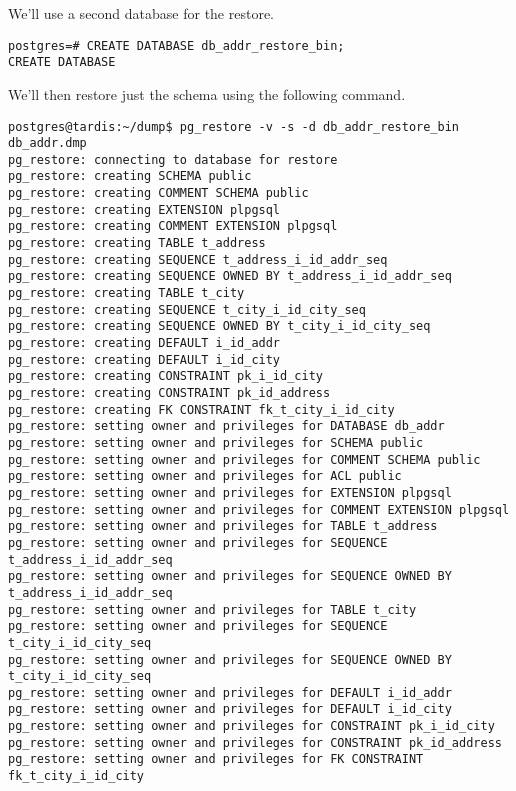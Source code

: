 We'll use a second database for the restore.

\begin{lstlisting}[style=pgsql]
postgres=# CREATE DATABASE db_addr_restore_bin;
CREATE DATABASE

\end{lstlisting}

We'll then restore just the schema using the following command.

\begin{verbatim}
postgres@tardis:~/dump$ pg_restore -v -s -d db_addr_restore_bin db_addr.dmp 
pg_restore: connecting to database for restore
pg_restore: creating SCHEMA public
pg_restore: creating COMMENT SCHEMA public
pg_restore: creating EXTENSION plpgsql
pg_restore: creating COMMENT EXTENSION plpgsql
pg_restore: creating TABLE t_address
pg_restore: creating SEQUENCE t_address_i_id_addr_seq
pg_restore: creating SEQUENCE OWNED BY t_address_i_id_addr_seq
pg_restore: creating TABLE t_city
pg_restore: creating SEQUENCE t_city_i_id_city_seq
pg_restore: creating SEQUENCE OWNED BY t_city_i_id_city_seq
pg_restore: creating DEFAULT i_id_addr
pg_restore: creating DEFAULT i_id_city
pg_restore: creating CONSTRAINT pk_i_id_city
pg_restore: creating CONSTRAINT pk_id_address
pg_restore: creating FK CONSTRAINT fk_t_city_i_id_city
pg_restore: setting owner and privileges for DATABASE db_addr
pg_restore: setting owner and privileges for SCHEMA public
pg_restore: setting owner and privileges for COMMENT SCHEMA public
pg_restore: setting owner and privileges for ACL public
pg_restore: setting owner and privileges for EXTENSION plpgsql
pg_restore: setting owner and privileges for COMMENT EXTENSION plpgsql
pg_restore: setting owner and privileges for TABLE t_address
pg_restore: setting owner and privileges for SEQUENCE t_address_i_id_addr_seq
pg_restore: setting owner and privileges for SEQUENCE OWNED BY t_address_i_id_addr_seq
pg_restore: setting owner and privileges for TABLE t_city
pg_restore: setting owner and privileges for SEQUENCE t_city_i_id_city_seq
pg_restore: setting owner and privileges for SEQUENCE OWNED BY t_city_i_id_city_seq
pg_restore: setting owner and privileges for DEFAULT i_id_addr
pg_restore: setting owner and privileges for DEFAULT i_id_city
pg_restore: setting owner and privileges for CONSTRAINT pk_i_id_city
pg_restore: setting owner and privileges for CONSTRAINT pk_id_address
pg_restore: setting owner and privileges for FK CONSTRAINT fk_t_city_i_id_city

\end{verbatim}

